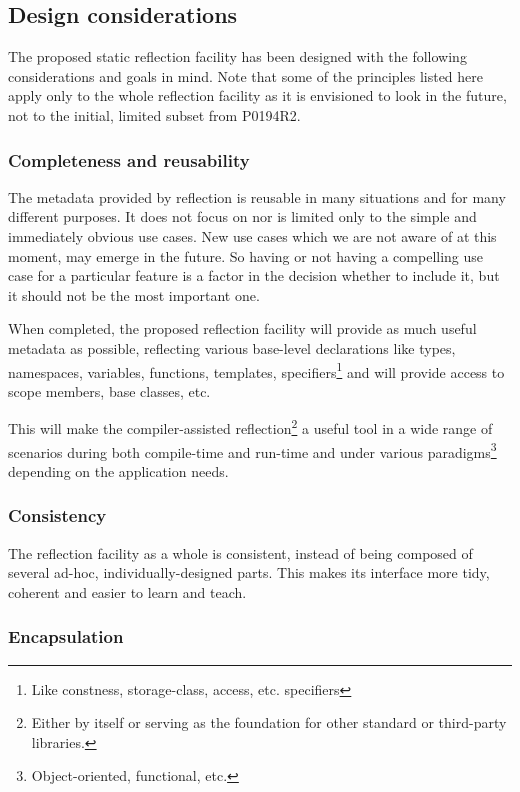 \subsection{Design considerations}
\label{design-prefs}

The proposed static reflection facility has been designed with the following
considerations and goals in mind. 
Note that some of the principles listed here
apply only to the whole reflection facility as it is envisioned
to look in the future, not to the initial, limited subset from P0194R2.

\subsubsection{Completeness and reusability}
\label{design-completeness}

The metadata provided by reflection is reusable in many situations
and for many different purposes.
It does not focus on nor is limited only to the simple and immediately obvious
use cases. New use cases which we are not aware of at this moment, may emerge
in the future. So having or not having a compelling use case for a particular
feature is a factor in the decision whether to include it, but it should
not be the most important one.

When completed, the proposed reflection facility will provide as much useful
metadata as possible, reflecting various base-level
declarations like types, namespaces, variables, functions, templates,
specifiers\footnote{Like constness, storage-class, access, etc. specifiers} and
will provide access to scope members, base classes, etc.

This will make the compiler-assisted reflection\footnote{Either by itself or
serving as the foundation for other standard or third-party libraries.} a useful
tool in a wide range of scenarios during both compile-time
and run-time and under various paradigms\footnote{Object-oriented, functional,
etc.} depending on the application needs.

\subsubsection{Consistency}
\label{design-consistency}

The reflection facility as a whole is consistent, instead of being
composed of several ad-hoc, individually-designed parts. This makes
its interface more tidy, coherent and easier to learn and teach.

\subsubsection{Encapsulation}
\label{design-encapsulation}

